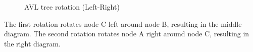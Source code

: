 \begin{figure}[H]
    \centering
    
    \caption{AVL tree rotation (Left-Right)}
\end{figure}

The first rotation rotates node C left around node B, resulting in the middle diagram. The second rotation rotates node A right around node C, resulting in the right diagram.